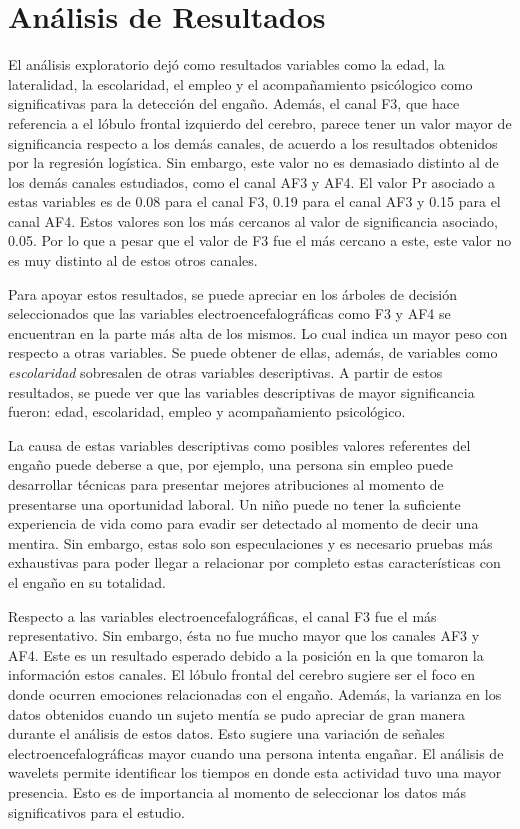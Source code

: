 \chapter{Análisis de Resultados}
El análisis exploratorio dejó como resultados variables como la edad, la lateralidad, la escolaridad, el empleo y el acompañamiento psicólogico como significativas para la detección del engaño. Además, el canal F3, que hace referencia a el lóbulo frontal izquierdo del cerebro, parece tener un valor mayor de significancia respecto a los demás canales, de acuerdo a los resultados obtenidos por la regresión logística. Sin embargo, este valor no es demasiado distinto al de los demás canales estudiados, como el canal AF3 y AF4. El valor Pr asociado a estas variables es de 0.08 para el canal F3, 0.19 para el canal AF3 y 0.15 para el canal AF4. Estos valores son los más cercanos al valor de significancia asociado, 0.05. Por lo que a pesar que el valor de F3 fue el más cercano a este, este valor no es muy distinto al de estos otros canales.

Para apoyar estos resultados, se puede apreciar en los árboles de decisión seleccionados que las variables electroencefalográficas como F3 y AF4 se encuentran en la parte más alta de los mismos. Lo cual indica un mayor peso con respecto a otras variables. Se puede obtener de ellas, además, de variables como \textit{escolaridad} sobresalen de otras variables descriptivas. A partir de estos resultados, se puede ver que las variables descriptivas de mayor significancia fueron: edad, escolaridad, empleo y acompañamiento psicológico. 

La causa de estas variables descriptivas como posibles valores referentes del engaño puede deberse a que, por ejemplo, una persona sin empleo puede desarrollar técnicas para presentar mejores atribuciones al momento de presentarse una oportunidad laboral. Un niño puede no tener la suficiente experiencia de vida como para evadir ser detectado al momento de decir una mentira. Sin embargo, estas solo son especulaciones y es necesario pruebas más exhaustivas para poder llegar a relacionar por completo estas características con el engaño en su totalidad.

Respecto a las variables electroencefalográficas, el canal F3 fue el más representativo. Sin embargo, ésta no fue mucho mayor que los canales AF3 y AF4. Este es un resultado esperado debido a la posición en la que tomaron la información estos canales. El lóbulo frontal del cerebro sugiere ser el foco en donde ocurren emociones relacionadas con el engaño. Además, la varianza en los datos obtenidos cuando un sujeto mentía se pudo apreciar de gran manera durante el análisis de estos datos. Esto sugiere una variación de señales electroencefalográficas mayor cuando una persona intenta engañar. El análisis de wavelets permite identificar los tiempos en donde esta actividad tuvo una mayor presencia. Esto es de importancia al momento de seleccionar los datos más significativos para el estudio.

